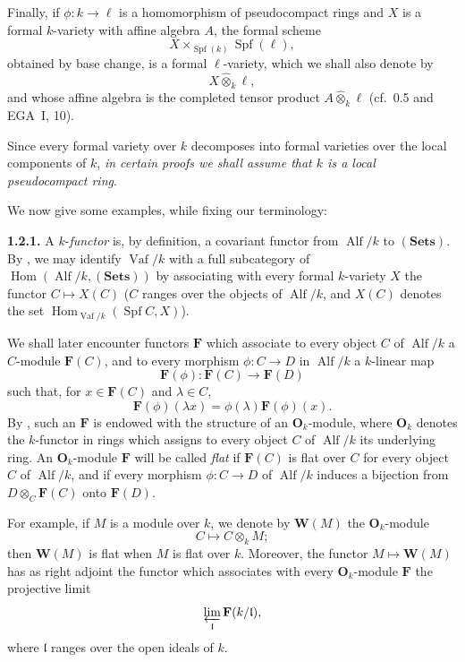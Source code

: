 \label{sga3:VIIB:1.2.D}%
Finally, if \(\phi:k\to\ell\) is a homomorphism of pseudocompact
rings and \(X\) is a formal \(k\)-variety with affine algebra
\(A\), the formal scheme
\[
  X\times_{\operatorname{Spf}(k)}\operatorname{Spf}(\ell),
\]
obtained by base change, is a formal \(\ell\)-variety, which we shall
also denote by
\[
  X\widehat{\otimes}_k\ell,
\]
and whose affine algebra is the completed tensor product
\(A\widehat{\otimes}_k\ell\) (cf.\ 0.5 and EGA~I, 10).

Since every formal variety over \(k\) decomposes into formal
varieties over the local components of \(k\), \emph{in certain proofs
we shall assume that \(k\) is a local pseudocompact ring}.

We now give some examples, while fixing our terminology:

\medskip
\noindent\textbf{1.2.1.}
\label{sga3:VIIB:1.2.1}
A \(k\)-\emph{functor} is, by definition, a covariant functor from
\(\operatorname{Alf}/k\) to \((\mathbf{Sets})\). By , we may
identify \(\operatorname{Vaf}/k\) with a full subcategory of
\(\operatorname{Hom}(\operatorname{Alf}/k,(\mathbf{Sets}))\) by
associating with every formal \(k\)-variety \(X\) the functor
\(C\mapsto X(C)\) (\(C\) ranges over the objects of
\(\operatorname{Alf}/k\), and \(X(C)\) denotes the set
\(\operatorname{Hom}_{\operatorname{Vaf}/k}(\operatorname{Spf}C,X)\)).

We shall later encounter functors \(\mathbf F\) which associate
to every object \(C\) of \(\operatorname{Alf}/k\) a \(C\)-module
\(\mathbf F(C)\), and to every morphism
\(\phi:C\to D\) in \(\operatorname{Alf}/k\) a \(k\)-linear map
\[
  \mathbf F(\phi):\mathbf F(C)\longrightarrow\mathbf F(D)
\]
such that, for \(x\in\mathbf F(C)\) and \(\lambda\in C\),
\[
  \mathbf F(\phi)(\lambda x)
  =
  \phi(\lambda)\mathbf F(\phi)(x).
\]
By , such an \(\mathbf F\) is endowed with the structure
of an \(\mathbf O_k\)-module, where \(\mathbf O_k\) denotes the
\(k\)-functor in rings which assigns to every object \(C\) of
\(\operatorname{Alf}/k\) its underlying ring. An
\(\mathbf O_k\)-module \(\mathbf F\) will be called \emph{flat} if
\(\mathbf F(C)\) is flat over \(C\) for every object \(C\) of
\(\operatorname{Alf}/k\), and if every morphism \(\phi:C\to D\) of
\(\operatorname{Alf}/k\) induces a bijection from
\(D\otimes_C\mathbf F(C)\) onto \(\mathbf F(D)\).

For example, if \(M\) is a module over \(k\), we denote by
\(\mathbf W(M)\) the \(\mathbf O_k\)-module
\[
  C\longmapsto C\otimes_kM;
\]
then \(\mathbf W(M)\) is flat when \(M\) is flat over \(k\). Moreover,
the functor \(M\mapsto\mathbf W(M)\) has as right adjoint the functor
which associates with every \(\mathbf O_k\)-module \(\mathbf F\) the
projective limit
\[
  \varprojlim_{\mathfrak l}\mathbf F(k/\mathfrak l),
\]
where \(\mathfrak l\) ranges over the open ideals of \(k\).

